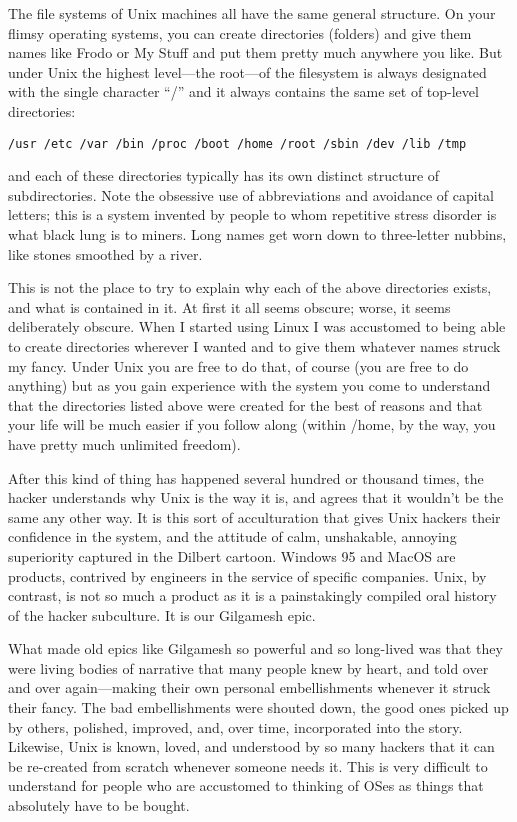 \documentclass[
  fontsize=11pt,
  paper=landscape,
  twocolumn=true,
  pagesize=pdftex,
  headings=small,
  DIV=15,
  ]{scrartcl}
\begin{document}
The file systems of Unix machines all have the same general structure.
On your flimsy operating systems, you can create directories (folders)
and give them names like Frodo or My Stuff and put them pretty much
anywhere you like. But under Unix the highest level---the root---of the
filesystem is always designated with the single character ``/'' and it
always contains the same set of top-level directories:

\begin{lstlisting}
/usr /etc /var /bin /proc /boot /home /root /sbin /dev /lib /tmp
\end{lstlisting}
and each of these directories typically has its own distinct structure
of subdirectories. Note the obsessive use of abbreviations and avoidance
of capital letters; this is a system invented by people to whom
repetitive stress disorder is what black lung is to miners. Long names
get worn down to three-letter nubbins, like stones smoothed by a river.

This is not the place to try to explain why each of the above
directories exists, and what is contained in it. At first it all seems
obscure; worse, it seems deliberately obscure. When I started using
Linux I was accustomed to being able to create directories wherever I
wanted and to give them whatever names struck my fancy. Under Unix you
are free to do that, of course (you are free to do anything) but as you
gain experience with the system you come to understand that the
directories listed above were created for the best of reasons and that
your life will be much easier if you follow along (within /home, by the
way, you have pretty much unlimited freedom).

After this kind of thing has happened several hundred or thousand times,
the hacker understands why Unix is the way it is, and agrees that it
wouldn't be the same any other way. It is this sort of acculturation
that gives Unix hackers their confidence in the system, and the attitude
of calm, unshakable, annoying superiority captured in the Dilbert
cartoon. Windows 95 and MacOS are products, contrived by engineers in
the service of specific companies. Unix, by contrast, is not so much a
product as it is a painstakingly compiled oral history of the hacker
subculture. It is our Gilgamesh epic.

What made old epics like Gilgamesh so powerful and so long-lived was
that they were living bodies of narrative that many people knew by
heart, and told over and over again---making their own personal
embellishments whenever it struck their fancy. The bad embellishments
were shouted down, the good ones picked up by others, polished,
improved, and, over time, incorporated into the story. Likewise, Unix is
known, loved, and understood by so many hackers that it can be
re-created from scratch whenever someone needs it. This is very
difficult to understand for people who are accustomed to thinking of
OSes as things that absolutely have to be bought.
\end{document}
